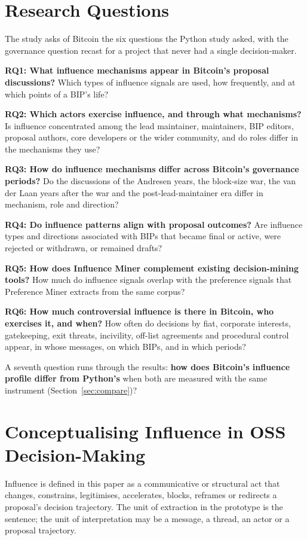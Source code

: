 \documentclass[sigconf,screen]{acmart}
\begin{document}
\section{Research Questions}

The study asks of Bitcoin the six questions the Python study asked, with the governance question recast for a project that never had a single decision-maker.

\textbf{RQ1: What influence mechanisms appear in Bitcoin's proposal discussions?} Which types of influence signals are used, how frequently, and at which points of a BIP's life?

\textbf{RQ2: Which actors exercise influence, and through what mechanisms?} Is influence concentrated among the lead maintainer, maintainers, BIP editors, proposal authors, core developers or the wider community, and do roles differ in the mechanisms they use?

\textbf{RQ3: How do influence mechanisms differ across Bitcoin's governance periods?} Do the discussions of the Andresen years, the block-size war, the van der Laan years after the war and the post-lead-maintainer era differ in mechanism, role and direction?

\textbf{RQ4: Do influence patterns align with proposal outcomes?} Are influence types and directions associated with BIPs that became final or active, were rejected or withdrawn, or remained drafts?

\textbf{RQ5: How does Influence Miner complement existing decision-mining tools?} How much do influence signals overlap with the preference signals that Preference Miner extracts from the same corpus?

\textbf{RQ6: How much controversial influence is there in Bitcoin, who exercises it, and when?} How often do decisions by fiat, corporate interests, gatekeeping, exit threats, incivility, off-list agreements and procedural control appear, in whose messages, on which BIPs, and in which periods?

A seventh question runs through the results: \textbf{how does Bitcoin's influence profile differ from Python's} when both are measured with the same instrument (Section~\ref{sec:compare})?

\section{Conceptualising Influence in OSS Decision-Making}
\label{sec:taxonomy}

Influence is defined in this paper as a communicative or structural act that changes, constrains, legitimises, accelerates, blocks, reframes or redirects a proposal's decision trajectory. The unit of extraction in the prototype is the sentence; the unit of interpretation may be a message, a thread, an actor or a proposal trajectory.
\end{document}
